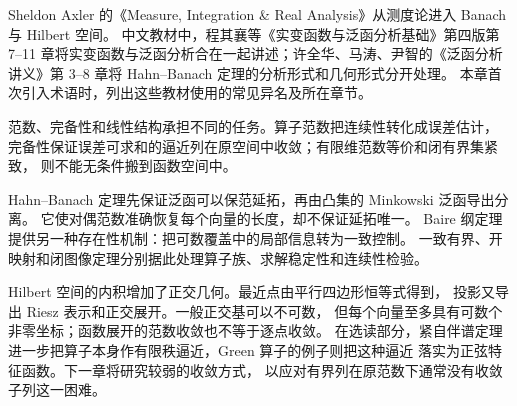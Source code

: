 \ProseParagraphBreak

Sheldon Axler 的《Measure, Integration \& Real Analysis》\cite[Chapters 6 and 8]{Axler2020Measure}从测度论进入 Banach 与 Hilbert 空间。
中文教材中，程其襄等《实变函数与泛函分析基础》第四版\cite{Cheng2019ShibianFanhan}第 7--11 章将实变函数与泛函分析合在一起讲述；许全华、马涛、尹智的《泛函分析讲义》\cite{Xu2017Fanhan}第 3--8 章将 Hahn--Banach 定理的分析形式和几何形式分开处理。
本章首次引入术语时，列出这些教材使用的常见异名及所在章节。






\begin{chaptersummary}
范数、完备性和线性结构承担不同的任务。算子范数把连续性转化成误差估计，
完备性保证误差可求和的逼近列在原空间中收敛；有限维范数等价和闭有界集紧致，
则不能无条件搬到函数空间中。

\ProseParagraphBreak

Hahn--Banach 定理先保证泛函可以保范延拓，再由凸集的 Minkowski 泛函导出分离。
它使对偶范数准确恢复每个向量的长度，却不保证延拓唯一。
Baire 纲定理提供另一种存在性机制：把可数覆盖中的局部信息转为一致控制。
一致有界、开映射和闭图像定理分别据此处理算子族、求解稳定性和连续性检验。

\ProseParagraphBreak

Hilbert 空间的内积增加了正交几何。最近点由平行四边形恒等式得到，
投影又导出 Riesz 表示和正交展开。一般正交基可以不可数，
但每个向量至多具有可数个非零坐标；函数展开的范数收敛也不等于逐点收敛。
在选读部分，紧自伴谱定理进一步把算子本身作有限秩逼近，Green 算子的例子则把这种逼近
落实为正弦特征函数。下一章将研究较弱的收敛方式，
以应对有界列在原范数下通常没有收敛子列这一困难。
\end{chaptersummary}


\BookExercises


